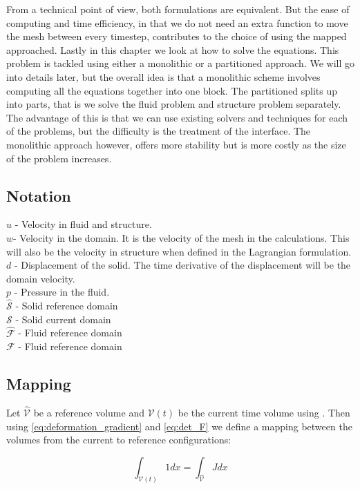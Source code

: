 From a technical point of view, both formulations are equivalent.\cite{Richter2016} But the ease of computing and time efficiency, in that we do not need an extra function to move the mesh between every timestep, contributes to the choice of using the mapped approached.
Lastly in this chapter we look at how to solve the equations. This problem is tackled using either a monolithic or a partitioned approach. We will go into details later, but the overall idea is that a monolithic scheme involves computing all the equations together into one block. The partitioned splits up into parts, that is we solve the fluid problem and structure problem separately. The advantage of this is that we can use existing solvers and techniques for each of the problems, but the difficulty is the treatment of the interface. The monolithic approach however, offers more stability but is more costly as the size of the problem increases\cite{Liu2014}.


\subsection*{Notation}
$u$ - Velocity in fluid and structure. \\
$w$- Velocity in the domain. It is the velocity of the mesh in the calculations. This will also be the velocity in structure when defined in the Lagrangian formulation. \\
$d$ - Displacement of the solid. The time derivative of the displacement will be the domain velocity. \\
$p$ - Pressure in the fluid. \\
$\hat{\mathcal{S}}$ - Solid reference domain  \\
$\mathcal{S}$ - Solid current domain  \\
$ \hat{\mathcal{F}}$ - Fluid reference domain \\
$ \mathcal{F} $ - Fluid reference domain \\

\subsection*{Mapping}
Let $\hat{\mathcal{V}}$ be a reference volume and $\mathcal{V}(t)$ be the current time volume using \cite{Richter}. Then using \eqref{eq:deformation_gradient} and \eqref{eq:det_F} we define a mapping between the volumes from the current to reference configurations:

\begin{equation}
 \int_{\mathcal{V}(t)} 1  dx = \int_{\hat{\mathcal{V}}} J dx  
\end{equation}

